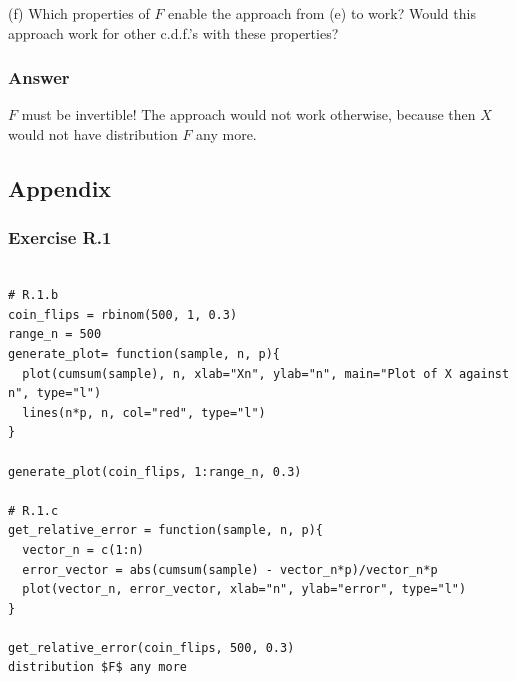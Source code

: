 \documentclass[12pt]{article}
\begin{document}
(f) Which properties of $F$ enable the approach from (e) to work? Would this approach work for other c.d.f.’s with these properties?
\subsubsection*{Answer}
$F$ must be invertible! The approach would not work otherwise, because then $X$ would not have distribution $F$ any more.

\subsection*{Appendix}

\subsubsection*{Exercise R.1}
\begin{verbatim}

# R.1.b
coin_flips = rbinom(500, 1, 0.3)
range_n = 500
generate_plot= function(sample, n, p){
  plot(cumsum(sample), n, xlab="Xn", ylab="n", main="Plot of X against n", type="l")
  lines(n*p, n, col="red", type="l")
}

generate_plot(coin_flips, 1:range_n, 0.3)

# R.1.c
get_relative_error = function(sample, n, p){
  vector_n = c(1:n)
  error_vector = abs(cumsum(sample) - vector_n*p)/vector_n*p
  plot(vector_n, error_vector, xlab="n", ylab="error", type="l")
}

get_relative_error(coin_flips, 500, 0.3)
distribution $F$ any more\end{verbatim}
\end{document}
